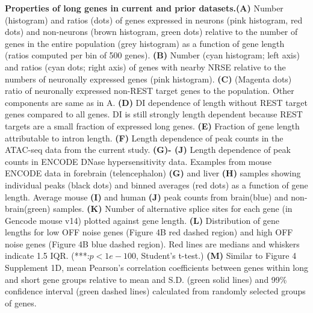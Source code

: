 \textbf{Properties of long genes in current and prior datasets.}\textbf{(A)} Number (histogram) and ratios (dots) of genes expressed in neurons (pink histogram, red dots) and non-neurons (brown histogram, green dots) relative to the number of genes in the entire population (grey histogram) as a function of gene length (ratios computed per bin of 500 genes). 
\textbf{(B)} Number (cyan histogram; left axis) and ratios (cyan dots; right axis) of genes with nearby NRSE relative to the numbers of neuronally expressed genes (pink histogram). 
\textbf{(C)} (Magenta dots) ratio of neuronally expressed non-REST target genes to the population. Other components are same as in A.
\textbf{(D)} DI dependence of length without REST target genes compared to all genes. DI is still strongly length dependent because REST targets are a small fraction of expressed long genes.
\textbf{(E)} Fraction of gene length attributable to intron length.
\textbf{(F)} Length dependence of peak counts in the ATAC-seq data from the current study.
\textbf{(G)- (J)} Length dependence of peak counts in ENCODE DNase hypersensitivity data. Examples from mouse ENCODE data in forebrain (telencephalon) \textbf{(G)} and liver \textbf{(H)} samples showing individual peaks (black dots) and binned averages (red dots) as a function of gene length. Average mouse \textbf{(I)} and human \textbf{(J)} peak counts from brain(blue) and non-brain(green) samples.
\textbf{(K)} Number of alternative splice sites for each gene (in Gencode mouse v14) plotted against gene length.
\textbf{(L)} Distribution of gene lengths for low OFF noise genes (Figure 4B red dashed region) and high OFF noise genes (Figure 4B blue dashed region). Red lines are medians and whiskers indicate 1.5 IQR. (***:$p<1e-100$, Student's t-test.)
\textbf{(M)} Similar to Figure 4 Supplement 1D, mean Pearson's correlation coefficients between genes within long and short gene groups relative to mean and S.D. (green solid lines) and 99\% confidence interval (green dashed lines) calculated from randomly selected groups of genes.




